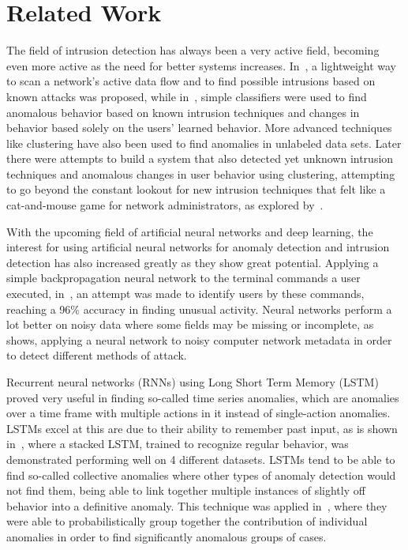 \chapter{Related Work}\label{ch:related_work}

The field of intrusion detection has always been a very active field, becoming even more active as the need for better systems increases. In~\cite{roesch1999snort}, a lightweight way to scan a network's active data flow and to find possible intrusions based on known attacks was proposed, while in~\cite{lee1998data}, simple classifiers were used to find anomalous behavior based on known intrusion techniques and changes in behavior based solely on the users' learned behavior. More advanced techniques like clustering have also been used to find anomalies in unlabeled data sets. Later  there were attempts to build a system that also detected yet unknown intrusion techniques and anomalous changes in user behavior using clustering, attempting to go beyond the constant lookout for new intrusion techniques that felt like a cat-and-mouse game for network administrators, as explored by~\cite{Portnoy01intrusiondetection}.

With the upcoming field of artificial neural networks and deep learning, the interest for using artificial neural networks for anomaly detection and intrusion detection has also increased greatly as they show great potential. Applying a simple backpropagation neural network to the terminal commands a user executed, in~\cite{ryan1998intrusion}, an attempt was made to identify users by these commands, reaching a 96\% accuracy in finding unusual activity. Neural networks perform a lot better on noisy data where some fields may be missing or incomplete, as~\cite{cannady1998artificial} shows, applying a neural network to noisy computer network metadata in order to detect different methods of attack.

Recurrent neural networks (RNNs) using Long Short Term Memory (LSTM) proved very useful in finding so-called time series anomalies, which are anomalies over a time frame with multiple actions in it instead of single-action anomalies. LSTMs excel at this are due to their ability to remember past input, as is shown in~\cite{malhotra2015long}, where a stacked LSTM, trained to recognize regular behavior, was demonstrated performing well on 4 different datasets. LSTMs tend to be able to find so-called collective anomalies where other types of anomaly detection would not find them, being able to link together multiple instances of slightly off behavior into a definitive anomaly. This technique was applied in~\cite{olsson2015probabilistic}, where they were able to probabilistically group together the contribution of individual anomalies in order to find significantly anomalous groups of cases.